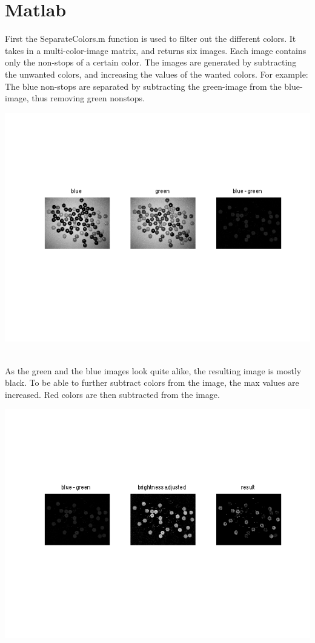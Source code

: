 \lstset{language=Matlab}
\lstset{frame=single}
\section{Matlab}
First the SeparateColors.m function is used to filter out the different colors. It takes in a multi-color-image matrix, and returns six images. Each image contains only the non-stops of a certain color. The images are generated by subtracting the unwanted colors, and increasing the values of the wanted colors.
For example: The blue non-stops are separated by subtracting the green-image from the blue-image, thus removing green nonstops. 
\\
\centerline{\includegraphics[clip=true, trim=40 100 40 80]{separate_step1.png}}
\\
As the green and the blue images look quite alike, the resulting image is mostly black. To be able to further subtract colors from the image, the max values are increased. Red colors are then subtracted from the image.
\\
\centerline{\includegraphics[clip=true, trim=40 100 40 80]{separate_step2_1.png}}
